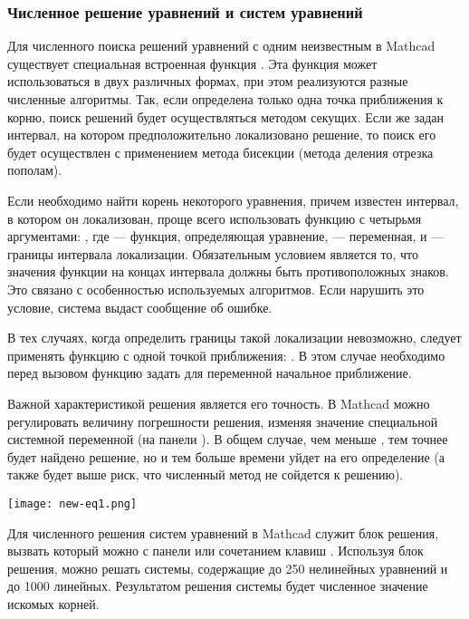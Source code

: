 \subsubsection*{Численное решение уравнений и систем уравнений}
Для численного поиска решений уравнений с одним неизвестным в Mathcad существует специальная встроенная функция . Эта функция может использоваться в двух различных формах, при этом реализуются разные численные алгоритмы. Так, если определена только одна точка приближения к корню, поиск решений будет осуществляться методом секущих. Если же задан интервал, на котором предположительно локализовано решение, то поиск его будет осуществлен с применением метода бисекции (метода деления отрезка пополам).

Если необходимо найти корень некоторого уравнения, причем известен интервал, в котором он локализован, проще всего использовать функцию  с четырьмя аргументами: , где  --- функция, определяющая уравнение,  --- переменная,  и  --- границы интервала локализации. Обязательным условием является то, что значения функции на концах интервала должны быть противоположных знаков. Это связано с особенностью используемых  алгоритмов. Если нарушить это условие, система выдаст сообщение об ошибке.

В тех случаях, когда определить границы такой локализации невозможно, следует применять функцию  с одной точкой приближения: . В этом случае необходимо перед вызовом функцию  задать для переменной  начальное приближение.

Важной характеристикой решения является его точность. В Mathcad можно регулировать величину погрешности решения, изменяя значение специальной системной переменной  (на панели ). В общем случае, чем меньше , тем точнее будет найдено решение, но и тем больше времени уйдет на его определение (а также будет выше риск, что численный метод не сойдется к решению).

\begin{center}
	\texttt{[image: new-eq1.png]}
\end{center}

Для численного решения систем уравнений в Mathcad служит блок решения, вызвать который можно с панели  или сочетанием клавиш . Используя блок решения, можно решать системы, содержащие до 250 нелинейных уравнений и до 1000 линейных. Результатом решения системы будет численное значение искомых корней.

